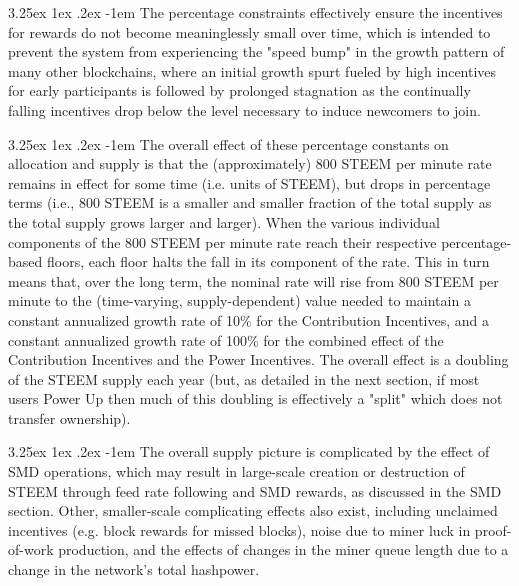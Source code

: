 \documentclass{article}
\makeatletter
\renewcommand\paragraph{\@startsection{paragraph}{5}{\z@}%
  {3.25ex \@plus1ex \@minus.2ex}%
  {-1em}%
  {\normalfont\normalsize\bfseries}}
\makeatother
\begin{document}
        \paragraph{}
            The percentage constraints effectively ensure the incentives
for rewards do not become meaninglessly small over time, which is intended
to prevent the system from experiencing the "speed bump" in the growth
pattern of many other blockchains, where an initial growth spurt fueled by
high incentives for early participants is followed by prolonged stagnation
as the continually falling incentives drop below the level necessary to
induce newcomers to join.

        \paragraph{}
            The overall effect of these percentage constants on allocation
and supply is that the (approximately) 800 STEEM per minute rate remains in
effect for some time (i.e. units of STEEM), but drops in percentage terms
(i.e., 800 STEEM is a smaller and smaller fraction of the total supply as
the total supply grows larger and larger). When the various individual
components of the 800 STEEM per minute rate reach their respective
percentage-based floors, each floor halts the fall in its component of the
rate. This in turn means that, over the long term, the nominal rate will
rise from 800 STEEM per minute to the (time-varying, supply-dependent)
value needed to maintain a constant annualized growth rate of 10\% for the
Contribution Incentives, and a constant annualized growth rate of 100\% for
the combined effect of the Contribution Incentives and the Power
Incentives. The overall effect is a doubling of the STEEM supply each year
(but, as detailed in the next section, if most users Power Up then much of
this doubling is effectively a "split" which does not transfer ownership).

        \paragraph{}
            The overall supply picture is complicated by the effect of SMD
operations, which may result in large-scale creation or destruction of
STEEM through feed rate following and SMD rewards, as discussed in the SMD
section. Other, smaller-scale complicating effects also exist, including
unclaimed incentives (e.g. block rewards for missed blocks), noise due to
miner luck in proof-of-work production, and the effects of changes in the
miner queue length due to a change in the network's total hashpower.
\end{document}
